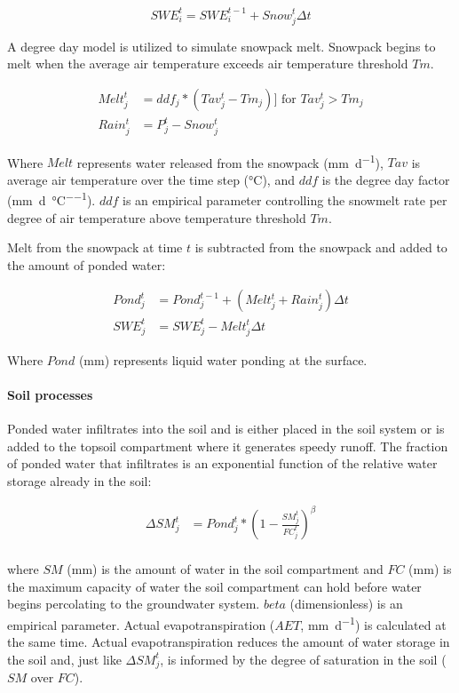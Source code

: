 \begin{equation}
SWE_i^t = SWE_i^{t-1} + Snow_j^t \Delta t
\end{equation}

A degree day model is utilized to simulate snowpack melt. Snowpack begins to melt when the average air temperature exceeds air temperature threshold $Tm$.

\begin{align}
Melt_j^t &= ddf_j * (Tav_j^t - Tm_j)  ]\text{ for } Tav_j^t > Tm_j \\
Rain_j^t &= P_j^t - Snow_j^t     
\end{align}

\noindent Where $Melt$ represents water released from the snowpack (\si{\milli\metre\per\day}), $Tav$ is average air temperature over the time step (\si{\degreeCelsius}), and $ddf$ is the degree day factor (\si{\milli\metre\per\day\per\degreeCelsius}). $ddf$ is an empirical parameter controlling the snowmelt rate per degree of air temperature above temperature threshold $Tm$. 

Melt from the snowpack at time $t$ is subtracted from the snowpack and added to the amount of ponded water:

\begin{align}
Pond_j^t &= Pond_j^{t-1} + (Melt_j^t + Rain_j^t)\Delta t \\
SWE_j^t &= SWE_j^t - Melt_j^t \Delta t   
\end{align}

\noindent Where $Pond$ (\si{\milli\metre}) represents liquid water ponding at the surface.

\paragraph{Soil processes} 

Ponded water infiltrates into the soil and is either placed in the soil system or is added to the topsoil compartment where it generates speedy runoff. The fraction of ponded water that infiltrates is an exponential function of the relative water storage already in the soil:

\begin{align}
\Delta SM_j^t &= Pond_j^t * \left(1 - \frac{SM_j^t}{FC_j^t} \right)^\beta \\
\end{align}

\noindent where $SM$ (\si{\milli\metre}) is the amount of water in the soil compartment and $FC$ (\si{\milli\metre}) is the maximum capacity of water the soil compartment can hold before water begins percolating to the groundwater system. $beta$ (dimensionless) is an empirical parameter. Actual evapotranspiration ($AET$, \si{\milli\metre\per\day}) is calculated at the same time. Actual evapotranspiration reduces the amount of water storage in the soil and, just like $\Delta SM_j^t$, is informed by the degree of saturation in the soil ($SM$ over $FC$).

